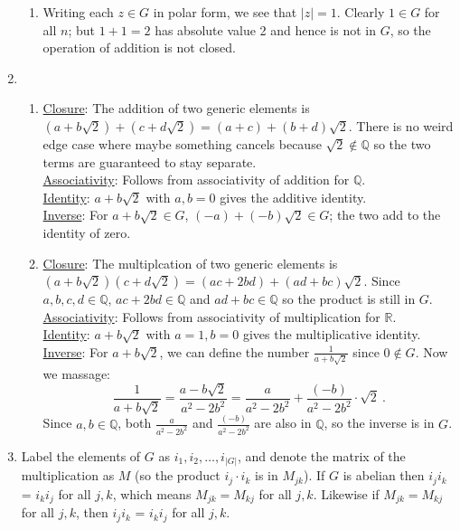 \documentclass[]{article}
\newcommand{\abs}[1]{\left\vert #1 \right\vert}
\newcommand{\bbq}{\mathbb{Q}}
\newcommand{\bbr}{\mathbb{R}}
\begin{document}
\begin{enumerate}
\begin{enumerate}
\item Writing each $z \in G$ in polar form, we see that $\abs{z} = 1$. Clearly $1 \in G$ for all $n$; but $1+1 = 2$ has absolute value 2 and hence is not in $G$, so the operation of addition is not closed.
\end{enumerate}
\item \begin{enumerate}
\item \underline{Closure}: The addition of two generic elements is $(a + b\sqrt{2}) + (c + d\sqrt{2}) = (a+c) + (b+d)\sqrt{2}$. There is no weird edge case where maybe something cancels because $\sqrt{2} \notin \bbq$ so the two terms are guaranteed to stay separate. \\
\underline{Associativity}: Follows from associativity of addition for $\bbq$. \\
\underline{Identity}: $a + b\sqrt{2}$ with $a,b=0$ gives the additive identity. \\
\underline{Inverse}: For $a+b\sqrt{2} \in G$, $(-a) + (-b)\sqrt{2} \in G$; the two add to the identity of zero.
\item \underline{Closure}: The multiplcation of two generic elements is $(a + b\sqrt{2})(c + d\sqrt{2}) = (ac+2bd) + (ad+bc)\sqrt{2}$. Since $a,b,c,d\in\bbq$, $ac+2bd\in\bbq$ and $ad+bc\in\bbq$ so the product is still in $G$.\\
\underline{Associativity}: Follows from associativity of multiplication for $\bbr$. \\
\underline{Identity}: $a + b\sqrt{2}$ with $a=1,b=0$ gives the multiplicative identity. \\
\underline{Inverse}: For $a+b\sqrt{2}$, we can define the number $\frac{1}{a+b\sqrt{2}}$ since $0 \notin G$. Now we massage:
\begin{equation}
\frac{1}{a+b\sqrt{2}} = \frac{a- b\sqrt{2}}{a^2-2b^2} = \frac{a}{a^2-2b^2} + \frac{(-b)}{a^2-2b^2}\cdot\sqrt{2}\ .
\end{equation}
Since $a,b\in\bbq$, both $\frac{a}{a^2-2b^2}$ and $\frac{(-b)}{a^2-2b^2}$ are also in $\bbq$, so the inverse is in $G$.
\end{enumerate}
\item Label the elements of $G$ as $i_1, i_2, \ldots, i_{\abs{G}}$, and denote the matrix of the multiplication as $M$ (so the product $i_j\cdot i_k$ is in $M_{jk}$). If $G$ is abelian then $i_j i_k$ = $i_k i_j$ for all $j,k$, which means $M_{jk} = M_{kj}$ for all $j,k$. Likewise if $M_{jk} = M_{kj}$ for all $j,k$, then $i_j i_k$ = $i_k i_j$ for all $j,k$.

\end{enumerate}
\end{document}
